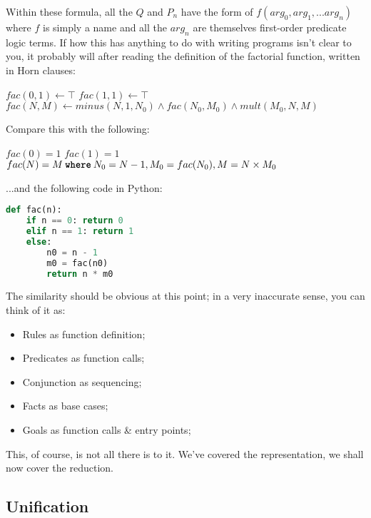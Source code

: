 Within these formula, all the \(Q\) and \(P_n\) have the form of $f(arg_0, arg_1, ... arg_n)$ where $f$ is simply a name and all the $arg_n$ are themselves first-order predicate logic terms. If how this has anything to do with writing programs isn't clear to you, it probably will after reading the definition of the factorial function, written in Horn clauses:


\begin{algorithm}
\begin{algorithmic}
  \State $fac(0,1) \gets \top$
  \State $fac(1,1) \gets \top$
  \State $fac(N,M) \gets minus(N,1,N_0) \wedge fac(N_0, M_0) \wedge mult(M_0,N,M)$
\end{algorithmic}
\end{algorithm}

Compare this with the following:

\begin{algorithm}
\begin{algorithmic}
  \State $fac(0) = 1$
  \State $fac(1) = 1$
  \State $fac(N) = M\: \textbf{\texttt{where}}\: N_0 = N-1, M_0 = fac(N_0), M=N\times M_0 $
\end{algorithmic}
\end{algorithm}

...and the following code in Python:

\begin{lstlisting}[language=Python]
def fac(n):
    if n == 0: return 0
    elif n == 1: return 1
    else:
        n0 = n - 1
        m0 = fac(n0)
        return n * m0
\end{lstlisting}

The similarity should be obvious at this point; in a very inaccurate sense, you can think of it as:

\begin{itemize}
	\item Rules as function definition;
	\item Predicates as function calls;
	\item Conjunction as sequencing;
	\item Facts as base cases;
	\item Goals as function calls \& entry points;
\end{itemize}

This, of course, is not all there is to it. We've covered the representation, we shall now cover the reduction.
\subsection{Unification}
\label{sec:org852f8b2}

